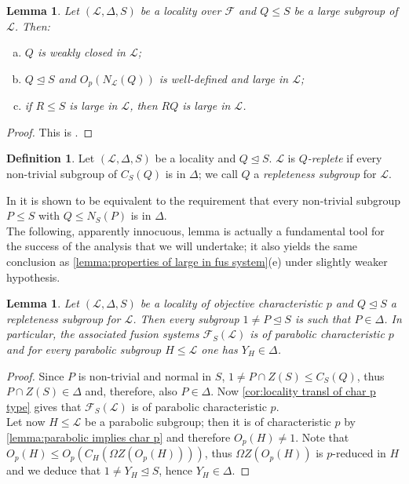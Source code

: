 \documentclass{amsart}
\numberwithin{equation}{section}
\newtheorem{lemma}[equation]{Lemma}
\theoremstyle{definition}
\newtheorem{definition}[equation]{Definition}
\theoremstyle{subresult}
\theoremstyle{caseresult}
\newcommand{\F}{\mathcal{F}}
\renewcommand{\L}{\mathcal{L}}
\newcommand{\norm}{\trianglelefteq}
\newcommand{\<}{\langle}
\renewcommand{\>}{\rangle}
\begin{document}
\begin{lemma}\label{lemma:large implies weakly closed}
    Let $(\L,\Delta,S)$ be a locality over $\F$ and $Q \le S$ be a large subgroup of $\L$. Then:
    \begin{enumerate}[(a)]
        \item $Q$ is weakly closed in $\L$;
        \item $Q \norm S$ and $O_p(N_\L(Q))$ is well-defined and large in $\L$;
        \item if $R \le S$ is large in $\L$, then $RQ$ is large in $\L$.
    \end{enumerate}
\end{lemma}
\begin{proof}
    This is \cite[Lemma 4.6]{Henke-Salati:2026}.
\end{proof}

\begin{definition}
    Let $(\L,\Delta,S)$ be a locality and $Q \norm S$. $\L$ is \emph{$Q$-replete} if every non-trivial subgroup of $C_S(Q)$ is in $\Delta$; we call $Q$ a \emph{repleteness subgroup} for $\L$.
\end{definition}
In \cite[Lemma 4.7]{Henke-Salati:2026} it is shown to be equivalent to the requirement that every non-trivial subgroup $P \le S$ with $Q \le N_S(P)$ is in $\Delta$.\\

The following, apparently innocuous, lemma is actually a fundamental tool for the success of the analysis that we will undertake; it also yields the same conclusion as \ref{lemma:properties of large in fus system}(e) under slightly weaker hypothesis.
\begin{lemma}\label{lemma:repleteness implies Y in Delta for parabolics}
    Let $(\L,\Delta,S)$ be a locality of objective characteristic $p$ and $Q \norm S$ a repleteness subgroup for $\L$. Then every subgroup $1 \ne P \norm S$ is such that $P \in \Delta$. In particular, the associated fusion systems $\F_S(\L)$ is of parabolic characteristic $p$ and for every parabolic subgroup $H \le \L$ one has $Y_H \in \Delta$.
\end{lemma}
\begin{proof}
    Since $P$ is non-trivial and normal in $S$, $1 \ne P \cap Z(S) \le C_S(Q)$, thus $P \cap Z(S) \in \Delta$ and, therefore, also $P \in \Delta$. Now \ref{cor:locality transl of char p type} gives that $\F_S(\L)$ is of parabolic characteristic $p$.\\
    Let now $H \le \L$ be a parabolic subgroup; then it is of characteristic $p$ by \ref{lemma:parabolic implies char p} and therefore $O_p(H) \ne 1$. Note that $O_p(H) \le O_p(C_H(\Omega Z(O_p(H))))$, thus $\Omega Z(O_p(H))$ is $p$-reduced in $H$ and we deduce that $1 \ne Y_H \norm S$, hence $Y_H \in \Delta$.
\end{proof}
\end{document}
